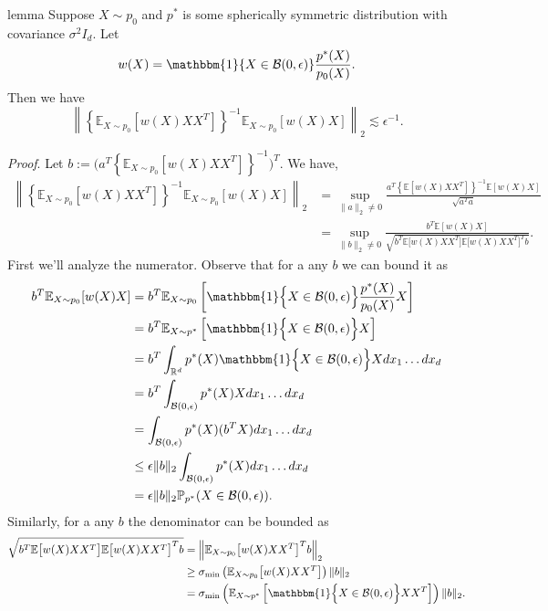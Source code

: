\documentclass[11pt]{article}
\begin{document}
\begin{restatable}{lemma}{} \label{lemma: pnorm bound} Suppose $X\sim p_0$ and $p^*$ is some spherically symmetric distribution with covariance $\sigma^2I_d$. Let
\[w(X) = \mathbbm{1}\{X \in \mathcal{B}(0,\epsilon)\}\frac{p^*(X)}{p_0(X)}.\]
Then we have
\begin{equation}
   \left\|\left\{\mathbb{E}_{X\sim p_{0}}[w(X)XX^{T}]\right\}^{-1}\mathbb{E}_{X\sim p_{0}}[w(X)X]\right\|_2 \lesssim \epsilon^{-1}.
\end{equation}
\end{restatable}

\noindent \textit{Proof}. Let $b:= \Big(a^{T}\left\{\mathbb{E}_{X\sim p_{0}}[w(X)XX^{T}]\right\}^{-1}\Big)^{T}$. We have,
\begin{align}
    \left\|\left\{\mathbb{E}_{X\sim p_0}[w(X)XX^{T}]\right\}^{-1}\mathbb{E}_{X\sim p_0}[w(X)X]\right\|_2 &= \sup_{\|a\|_2\neq 0} \frac{a^{T}\left\{\mathbb{E}[w(X)XX^{T}]\right\}^{-1}\mathbb{E}[w(X)X]}{\sqrt{a^{T}a}} \\
    &= \sup_{\|b\|_2 \neq 0} \frac{b^{T}\mathbb{E}[w(X)X]}{\sqrt{b^{T} \mathbb{E}\big[w(X)XX^{T}\big]\mathbb{E}\big[w(X)XX^{T}\big]^{T}b}}. \label{eq: projection norm}
\end{align}
First we'll analyze the numerator. Observe that for a any $b$ we can bound it as
\begin{align}
    b^{T}\mathbb{E}_{X \sim p_{0}}[w(X)X] &= b^{T}\mathbb{E}_{X \sim p_{0}}\left[\mathbbm{1}\Big\{X \in \mathcal{B}(0, \epsilon)\Big\}\frac{p^*(X)}{p_{0}(X)}X\right] \\
    &= b^{T}\mathbb{E}_{X \sim p^*}\left[\mathbbm{1}\Big\{X \in \mathcal{B}(0, \epsilon)\Big\}X\right] \\
    &= b^{T}\int_{\mathbb{R}^d}p^*(X)\mathbbm{1}\Big\{X \in \mathcal{B}(0, \epsilon)\Big\}X dx_1 \dots dx_d \\
    &= b^{T}\int_{\mathcal{B}(0, \epsilon)}p^*(X)X dx_1 \dots dx_d \\
    &= \int_{\mathcal{B}(0, \epsilon)}p^*(X)(b^{T}X) dx_1 \dots dx_d \\
    &\leq \epsilon \|b\|_2 \int_{\mathcal{B}(0, \epsilon)}p^*(X) dx_1 \dots dx_d \\
    &= \epsilon\|b\|_2\mathbb{P}_{p^*}(X \in \mathcal{B}(0, \epsilon)). \label{eq: numerator bound}
\end{align}
Similarly, for a any $b$ the denominator can be bounded as
\begin{align}
    \sqrt{b^{T} \mathbb{E}\big[w(X)XX^{T}\big]\mathbb{E}\big[w(X)XX^{T}\big]^{T}b} &= \left\| \mathbb{E}_{X \sim p_0}\big[w(X)XX^{T}\big]^{T}b\right\|_2 \\
    &\geq \sigma_{\min}\left(\mathbb{E}_{X\sim p_0}\big[w(X)XX^{T}\big]\right) \|b\|_2 \\
    &= \sigma_{\min}\left(\mathbb{E}_{X\sim p^*}\left[\mathbbm{1}\Big\{X \in \mathcal{B}(0, \epsilon)\Big\}XX^{T}\right]\right) \|b\|_2. \label{eq: denominator bound 1}
\end{align}
\end{document}
